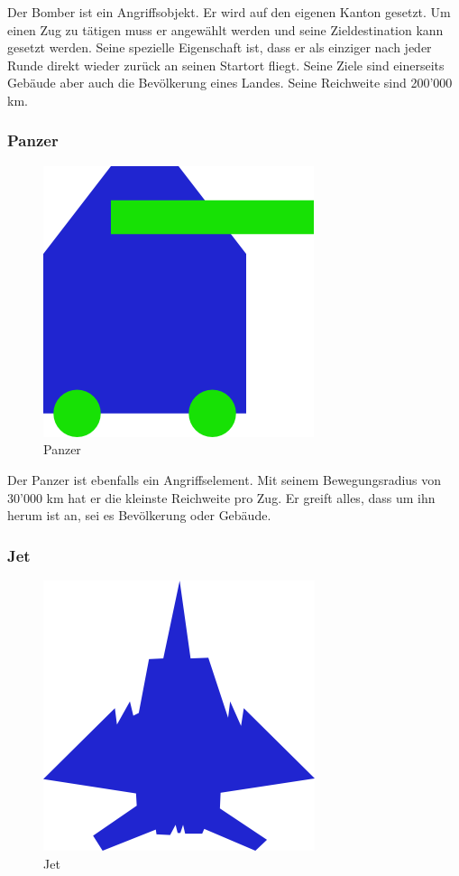 \documentclass[ngerman, 12pt, pdftex]{scrartcl}[2006/07/30]
\begin{document}
Der Bomber ist ein Angriffsobjekt.
Er wird auf den eigenen Kanton gesetzt. Um einen Zug zu tätigen muss er angewählt werden und seine Zieldestination kann gesetzt werden. Seine spezielle Eigenschaft ist, dass er als einziger nach jeder Runde direkt wieder zurück an seinen Startort fliegt.
Seine Ziele sind einerseits Gebäude aber auch die Bevölkerung eines Landes. Seine Reichweite sind 200'000 km.

\newpage

\subsubsection{Panzer}

\begin{figure}[h]
\centering
\includegraphics[scale=1.8]{einheiten/Panzer.png}
\caption{Panzer}
\end{figure}

Der Panzer ist ebenfalls ein Angriffselement.
Mit seinem Bewegungsradius von 30'000 km hat er die kleinste Reichweite pro Zug. Er greift alles, dass um ihn herum ist an, sei es Bevölkerung oder Gebäude. 


\subsubsection{Jet}

\begin{figure}[h]
\centering
\includegraphics[scale=1.8]{einheiten/Flugzeug.png}
\caption{Jet}
\end{figure}
\end{document}
